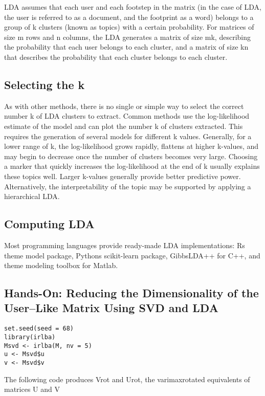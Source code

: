 LDA assumes that each user and each footstep in the matrix (in the
 case of LDA, the user is referred to as a document, and the 
footprint as a word) belongs to a group of k clusters (known as 
topics) with a certain probability. For matrices of size m rows and
 n columns, the LDA generates a matrix of size mk, describing the 
probability that each user belongs to each cluster, and a matrix of
 size kn that describes the probability that each cluster belongs 
to each cluster. 

\subsection{Selecting the k}

As with other methods, there is no single or simple way to select 
the correct number k of LDA clusters to extract. Common methods use
 the log-likelihood estimate of the model and can plot the number k
 of clusters extracted. This requires the generation of several 
models for different k values. Generally, for a lower range of k, 
the log-likelihood grows rapidly, flattens at higher k-values, and
 may begin to decrease once the number of clusters becomes very 
large. Choosing a marker that quickly increases the log-likelihood
 at the end of k usually explains these topics well. Larger 
k-values generally provide better predictive power. Alternatively,
 the interpretability of the topic may be supported by applying a 
hierarchical LDA.

\subsection{Computing LDA}

Most programming languages provide ready-made LDA implementations: Rs 
theme model package, Pythons scikit-learn package, 
GibbsLDA++ for C++, and theme modeling toolbox for Matlab.

\subsection{Hands-On: Reducing the Dimensionality of the
User–Like Matrix Using SVD and LDA}

\begin{verbatim}
set.seed(seed = 68)
library(irlba)
Msvd <- irlba(M, nv = 5)
u <- Msvd$u
v <- Msvd$v
\end{verbatim}

The following code produces Vrot and Urot, the varimaxrotated
equivalents of matrices U and V

